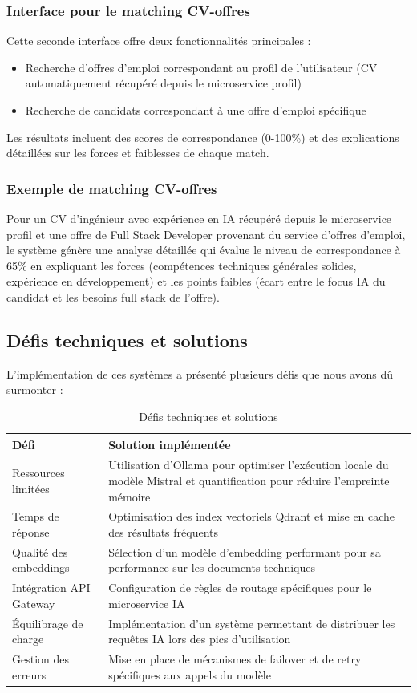 \subsubsection{Interface pour le matching CV-offres}
Cette seconde interface offre deux fonctionnalités principales :
\begin{itemize}
    \item Recherche d'offres d'emploi correspondant au profil de l'utilisateur (CV automatiquement récupéré depuis le microservice profil)
    \item Recherche de candidats correspondant à une offre d'emploi spécifique
\end{itemize}

Les résultats incluent des scores de correspondance (0-100\%) et des explications détaillées sur les forces et faiblesses de chaque match.

\subsubsection{Exemple de matching CV-offres}
Pour un CV d'ingénieur avec expérience en IA récupéré depuis le microservice profil et une offre de Full Stack Developer provenant du service d'offres d'emploi, le système génère une analyse détaillée qui évalue le niveau de correspondance à 65\% en expliquant les forces (compétences techniques générales solides, expérience en développement) et les points faibles (écart entre le focus IA du candidat et les besoins full stack de l'offre).

\subsection{Défis techniques et solutions}
L'implémentation de ces systèmes a présenté plusieurs défis que nous avons dû surmonter :

\begin{table}[H]
\centering
\begin{tabular}{|p{4cm}|p{10cm}|}
\hline
\textbf{Défi} & \textbf{Solution implémentée} \\ \hline
Ressources limitées & Utilisation d'Ollama pour optimiser l'exécution locale du modèle Mistral et quantification pour réduire l'empreinte mémoire \\ \hline
Temps de réponse & Optimisation des index vectoriels Qdrant et mise en cache des résultats fréquents \\ \hline
Qualité des embeddings & Sélection d'un modèle d'embedding performant pour sa performance sur les documents techniques \\ \hline
Intégration API Gateway & Configuration de règles de routage spécifiques pour le microservice IA \\ \hline
Équilibrage de charge & Implémentation d'un système permettant de distribuer les requêtes IA lors des pics d'utilisation \\ \hline
Gestion des erreurs & Mise en place de mécanismes de failover et de retry spécifiques aux appels du modèle \\ \hline
\end{tabular}
\caption{Défis techniques et solutions}
\end{table}

